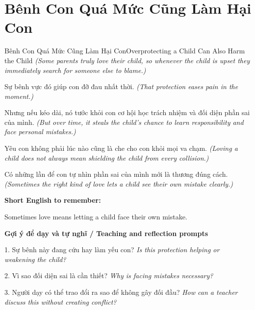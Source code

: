 \section{Bênh Con Quá Mức Cũng Làm Hại Con}
\begin{truyen}{Bênh Con Quá Mức Cũng Làm Hại Con}{Overprotecting a Child Can Also Harm the Child}
\textit{(Some parents truly love their child, so whenever the child is upset they immediately search for someone else to blame.)}

Sự bênh vực đó giúp con đỡ đau nhất thời.
\textit{(That protection eases pain in the moment.)}

Nhưng nếu kéo dài, nó tước khỏi con cơ hội học trách nhiệm và đối diện phần sai của mình.
\textit{(But over time, it steals the child’s chance to learn responsibility and face personal mistakes.)}

Yêu con không phải lúc nào cũng là che cho con khỏi mọi va chạm.
\textit{(Loving a child does not always mean shielding the child from every collision.)}

\end{truyen}

\begin{baihoc}
Có những lần để con tự nhìn phần sai của mình mới là thương đúng cách.
\textit{(Sometimes the right kind of love lets a child see their own mistake clearly.)}
\end{baihoc}

\begin{ghinhoanh}
\textbf{Short English to remember:}

Sometimes love means letting a child face their own mistake.

\end{ghinhoanh}

\begin{tuhocnhanh}
\textbf{Gợi ý để dạy và tự nghĩ / Teaching and reflection prompts}

1. Sự bênh này đang cứu hay làm yếu con? \textit{Is this protection helping or weakening the child?}

2. Vì sao đối diện sai là cần thiết? \textit{Why is facing mistakes necessary?}

3. Người dạy có thể trao đổi ra sao để không gây đối đầu? \textit{How can a teacher discuss this without creating conflict?}
\end{tuhocnhanh}
\ngancach

